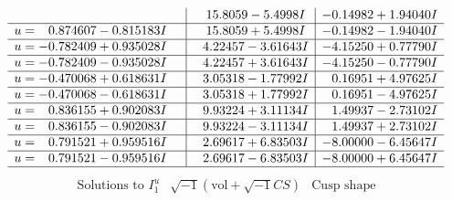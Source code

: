 \documentclass[1p]{elsarticle_modified}
\theoremstyle{definition}
\newcommand{\I}{\sqrt{-1}}
\begin{document}
$$\begin{array}{c|c|c}
 & \phantom{-}15.8059 - 5.4998 I & -0.14982 + 1.94040 I \\ \hline\begin{aligned}
u &= \phantom{-}0.874607 - 0.815183 I\end{aligned}
 & \phantom{-}15.8059 + 5.4998 I & -0.14982 - 1.94040 I \\ \hline\begin{aligned}
u &= -0.782409 + 0.935028 I\end{aligned}
 & \phantom{-}4.22457 - 3.61643 I & -4.15250 + 0.77790 I \\ \hline\begin{aligned}
u &= -0.782409 - 0.935028 I\end{aligned}
 & \phantom{-}4.22457 + 3.61643 I & -4.15250 - 0.77790 I \\ \hline\begin{aligned}
u &= -0.470068 + 0.618631 I\end{aligned}
 & \phantom{-}3.05318 - 1.77992 I & \phantom{-}0.16951 + 4.97625 I \\ \hline\begin{aligned}
u &= -0.470068 - 0.618631 I\end{aligned}
 & \phantom{-}3.05318 + 1.77992 I & \phantom{-}0.16951 - 4.97625 I \\ \hline\begin{aligned}
u &= \phantom{-}0.836155 + 0.902083 I\end{aligned}
 & \phantom{-}9.93224 + 3.11134 I & \phantom{-}1.49937 - 2.73102 I \\ \hline\begin{aligned}
u &= \phantom{-}0.836155 - 0.902083 I\end{aligned}
 & \phantom{-}9.93224 - 3.11134 I & \phantom{-}1.49937 + 2.73102 I \\ \hline\begin{aligned}
u &= \phantom{-}0.791521 + 0.959516 I\end{aligned}
 & \phantom{-}2.69617 + 6.83503 I & -8.00000 - 6.45647 I \\ \hline\begin{aligned}
u &= \phantom{-}0.791521 - 0.959516 I\end{aligned}
 & \phantom{-}2.69617 - 6.83503 I & -8.00000 + 6.45647 I\\
 \hline 
 \end{array}$$\newpage$$\begin{array}{c|c|c}  
\text{Solutions to }I^u_{1}& \I (\text{vol} + \sqrt{-1}CS) & \text{Cusp shape}\\

\end{array}$$
\end{document}
